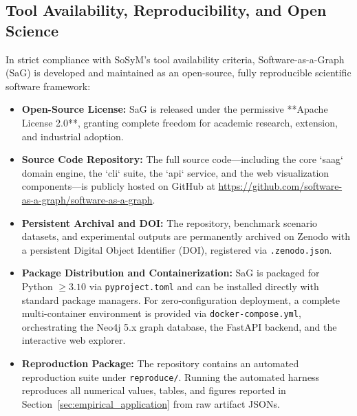\subsection{Tool Availability, Reproducibility, and Open Science}
\label{sec:tool:availability}

In strict compliance with SoSyM's tool availability criteria, Software-as-a-Graph (SaG) is developed and maintained as an open-source, fully reproducible scientific software framework:

\begin{itemize}
    \item \textbf{Open-Source License:} SaG is released under the permissive **Apache License 2.0**, granting complete freedom for academic research, extension, and industrial adoption.
    \item \textbf{Source Code Repository:} The full source code---including the core `saag` domain engine, the `cli` suite, the `api` service, and the web visualization components---is publicly hosted on GitHub at \url{https://github.com/software-as-a-graph/software-as-a-graph}.
    \item \textbf{Persistent Archival and DOI:} The repository, benchmark scenario datasets, and experimental outputs are permanently archived on Zenodo with a persistent Digital Object Identifier (DOI), registered via \texttt{.zenodo.json}.
    \item \textbf{Package Distribution and Containerization:} SaG is packaged for Python $\ge 3.10$ via \texttt{pyproject.toml} and can be installed directly with standard package managers. For zero-configuration deployment, a complete multi-container environment is provided via \texttt{docker-compose.yml}, orchestrating the Neo4j 5.x graph database, the FastAPI backend, and the interactive web explorer.
    \item \textbf{Reproduction Package:} The repository contains an automated reproduction suite under \texttt{reproduce/}. Running the automated harness reproduces all numerical values, tables, and figures reported in Section~\ref{sec:empirical_application} from raw artifact JSONs.
\end{itemize}
